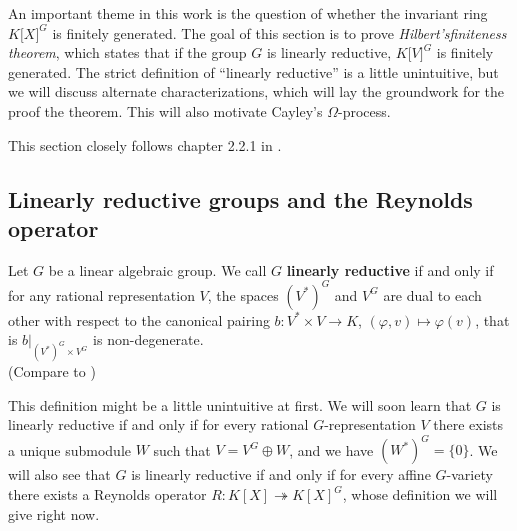 An important theme in this work is the question of whether the invariant ring $ K\lbrack X\rbrack^G $ is finitely generated.
The goal of this section is to prove \textit{Hilbert's\linebreak finiteness theorem}, which states that if the group $G$ is linearly reductive, $ K\lbrack V\rbrack^G $ is finitely generated.
The strict definition of ``linearly reductive'' is a little unintuitive, but we will discuss alternate characterizations, which will lay the groundwork for the proof the theorem.
This will also motivate Cayley's $\Omega$-process.

This section closely follows chapter 2.2.1 in \cite{DK15}.

\subsection{Linearly reductive groups and the Reynolds operator}


\begin{definition}
  Let $G$ be a linear algebraic group.
  We call $G$ \textbf{linearly reductive} if and only if for any rational representation $V$, the spaces $(V^\ast)^G$ and $V^G$ are dual to each other with respect to the canonical pairing $b \colon V^\ast \times V \rightarrow K$, $(\varphi,v) \mapsto \varphi(v)$, that is $\left. b \right|_{(V^\ast)^G \times V^G}$ is non-degenerate.  \\
  (Compare to \cite[2.2.1, 2.2.5 (a)$\implies$(b)]{DK15})
\end{definition}

This definition might be a little unintuitive at first.
We will soon learn that $G$ is linearly reductive if and only if for every rational $G$-representation $V$ there exists a unique submodule $W$ such that $V = V^G \oplus W$, and we have $(W^\ast)^G = \{0\}$.
We will also see that $G$ is linearly reductive if and only if for every affine $G$-variety there exists a Reynolds operator $R \colon K[X] \twoheadrightarrow K[X]^G$, whose definition we will give right now.


